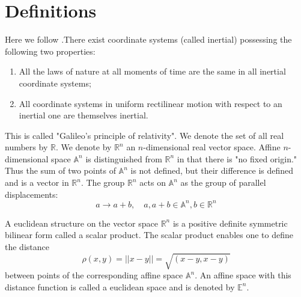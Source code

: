 \documentclass[11pt]{book}
\begin{document}
\section{Definitions}
\label{class-mech-def}

Here we follow  \cite{arnold-cm}.There exist coordinate systems (called inertial) possessing the following two properties:
\begin{enumerate}
    \item All the laws of nature at all moments of time are the same in all inertial coordinate systems;
    \item  All coordinate systems in uniform rectilinear motion with respect to an inertial one are themselves inertial.
\end{enumerate}
This is called "Galileo's principle of relativity".
We denote the set of all real numbers by $\mathbb{R}$. We denote by $\mathbb{R}^n$ an $n$-dimensional 
real vector space. Affine $n$-dimensional space $\mathbb{A}^n$ is distinguished 
from $\mathbb{R}^n$ in that there is "no fixed origin." Thus the sum of two points
of $\mathbb{A}^n$ is not defined, but their difference is defined and is a vector in $\mathbb{R}^n$.
The group $\mathbb{R}^n$ acts on $\mathbb{A}^n$ as the group of parallel displacements: 
\[a \rightarrow a+b,\quad a,a+b \in \mathbb{A}^n,b\in\mathbb{R}^n\]

A euclidean structure on the vector space $\mathbb{R}^n$ is a positive definite symmetric
bilinear form called a scalar product. The scalar product enables one to
define the distance
\[ \rho(x,y)=||x-y||=\sqrt{(x - y,x- y)} \]
between points of the corresponding affine space $\mathbb{A}^n$. An affine space with this
distance function is called a euclidean space and is denoted by $\mathbb{E}^n$.
\end{document}
